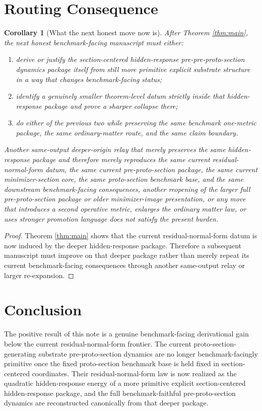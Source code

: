 \documentclass[11pt]{article}
\newtheorem{corollary}{Corollary}
\begin{document}
\section{Routing Consequence}

\begin{corollary}[What the next honest move now is]
\label{cor:next}
After Theorem \ref{thm:main}, the next honest benchmark-facing manuscript must either:
\begin{enumerate}
    \item derive or justify the section-centered hidden-response pre-pre-proto-section dynamics package itself from still more primitive explicit substrate structure in a way that changes benchmark-facing status;
    \item identify a genuinely smaller theorem-level datum strictly inside that hidden-response package and prove a sharper collapse there;
    \item do either of the previous two while preserving the same benchmark one-metric package, the same ordinary-matter route, and the same claim boundary.
\end{enumerate}
Another same-output deeper-origin relay that merely preserves the same hidden-response package and therefore merely reproduces the same current residual-normal-form datum, the same current pre-proto-section package, the same current minimizer-section core, the same proto-section benchmark base, and the same downstream benchmark-facing consequences, another reopening of the larger full pre-proto-section package or older minimizer-image presentation, or any move that introduces a second operative metric, enlarges the ordinary matter law, or uses stronger promotion language does not satisfy the present burden.
\end{corollary}

\begin{proof}
Theorem \ref{thm:main} shows that the current residual-normal-form datum is now induced by the deeper hidden-response package. Therefore a subsequent manuscript must improve on that deeper package rather than merely repeat its current benchmark-facing consequences through another same-output relay or larger re-expansion.
\end{proof}

\section{Conclusion}

The positive result of this note is a genuine benchmark-facing derivational gain below the current residual-normal-form frontier. The current proto-section-generating substrate pre-proto-section dynamics are no longer benchmark-facingly primitive once the fixed proto-section benchmark base is held fixed in section-centered coordinates. Their residual-normal-form law is now realized as the quadratic hidden-response energy of a more primitive explicit section-centered hidden-response package, and the full benchmark-faithful pre-proto-section dynamics are reconstructed canonically from that deeper package.
\end{document}
